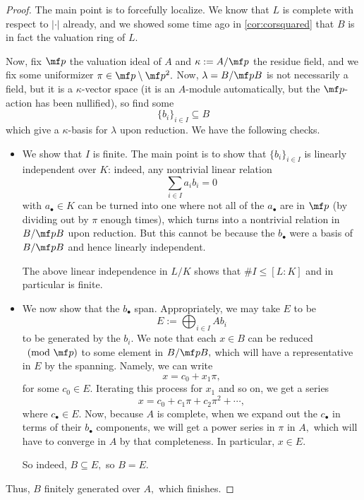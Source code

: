 \documentclass[../notes.tex]{subfiles}
\begin{document}
\begin{proof}
	The main point is to forcefully localize. We know that $L$ is complete with respect to $|\cdot|$ already, and we showed some time ago in \autoref{cor:corsquared} that $B$ is in fact the valuation ring of $L.$

	Now, fix $\mf p$ the valuation ideal of $A$ and $\kappa:=A/\mf p$ the residue field, and we fix some uniformizer $\pi\in\mf p\setminus\mf p^2.$ Now, $\lambda=B/\mf pB$ is not necessarily a field, but it is a $\kappa$-vector space (it is an $A$-module automatically, but the $\mf p$-action has been nullified), so find some
	\[\{b_i\}_{i\in I}\subseteq B\]
	which give a $\kappa$-basis for $\lambda$ upon reduction. We have the following checks.
	\begin{itemize}
		\item We show that $I$ is finite. The main point is to show that $\{b_i\}_{i\in I}$ is linearly independent over $K$: indeed, any nontrivial linear relation
		\[\sum_{i\in I}a_ib_i=0\]
		with $a_\bullet\in K$ can be turned into one where not all of the $a_\bullet$ are in $\mf p$ (by dividing out by $\pi$ enough times), which turns into a nontrivial relation in $B/\mf pB$ upon reduction. But this cannot be because the $b_\bullet$ were a basis of $B/\mf pB$ and hence linearly independent.
		
		The above linear independence in $L/K$ shows that $\#I\le[L:K]$ and in particular is finite.

		\item We now show that the $b_\bullet$ span. Appropriately, we may take $E$ to be
		\[E:=\bigoplus_{i\in I}Ab_i\]
		to be generated by the $b_i.$ We note that each $x\in B$ can be reduced$\pmod{\mf p}$ to some element in $B/\mf pB,$ which will have a representative in $E$ by the spanning. Namely, we can write
		\[x=c_0+x_1\pi,\]
		for some $c_0\in E.$ Iterating this process for $x_1$ and so on, we get a series
		\[x=c_0+c_1\pi+c_2\pi^2+\cdots,\]
		where $c_\bullet\in E.$ Now, because $A$ is complete, when we expand out the $c_\bullet$ in terms of their $b_\bullet$ components, we will get a power series in $\pi$ in $A,$ which will have to converge in $A$ by that completeness. In particular, $x\in E.$

		So indeed, $B\subseteq E,$ so $B=E.$
	\end{itemize}
	Thus, $B$ finitely generated over $A,$ which finishes.
\end{proof}
\end{document}
